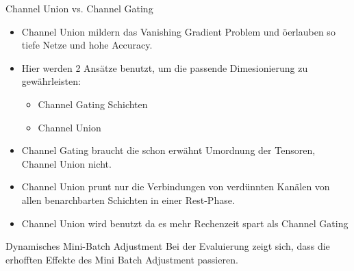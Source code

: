 \documentclass[10pt]{beamer}
\begin{document}
\begin{frame}{Channel Union vs. Channel Gating}
\begin{itemize}
 \item Channel Union mildern das Vanishing Gradient Problem und öerlauben so tiefe Netze und hohe Accuracy.
 \item Hier werden 2 Ansätze benutzt, um die passende Dimesionierung zu gewährleisten:
 \begin{itemize}
  \item Channel Gating Schichten
  \item Channel Union
 \end{itemize}
 \item Channel Gating braucht die schon erwähnt Umordnung der Tensoren, Channel Union nicht.
 \item Channel Union prunt nur die Verbindungen von verdünnten Kanälen von allen benarchbarten Schichten in einer Rest-Phase.
 \item Channel Union wird benutzt da es mehr Rechenzeit spart als Channel Gating
\end{itemize}
\end{frame}


\begin{frame}{Dynamisches Mini-Batch Adjustment}
Bei der Evaluierung zeigt sich, dass die erhofften Effekte des Mini Batch Adjustment passieren.
\end{frame}
\end{document}
